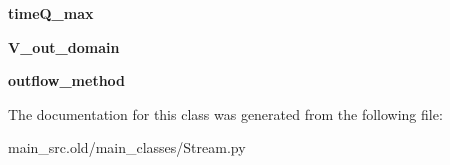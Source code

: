 \begin{DoxyCompactItemize}
\item 
\hypertarget{classmain__src_8old_1_1main__classes_1_1Stream_1_1Reach_aac9f6f373e120874ab3e09865a657eb0}{{\bfseries time\-Q\-\_\-max}}\label{classmain__src_8old_1_1main__classes_1_1Stream_1_1Reach_aac9f6f373e120874ab3e09865a657eb0}

\item 
\hypertarget{classmain__src_8old_1_1main__classes_1_1Stream_1_1Reach_a973c9e233a333a30ac494e4ebc2753d1}{{\bfseries V\-\_\-out\-\_\-domain}}\label{classmain__src_8old_1_1main__classes_1_1Stream_1_1Reach_a973c9e233a333a30ac494e4ebc2753d1}

\item 
\hypertarget{classmain__src_8old_1_1main__classes_1_1Stream_1_1Reach_a91c913d3ca8c213b9982867bc0dd05d6}{{\bfseries outflow\-\_\-method}}\label{classmain__src_8old_1_1main__classes_1_1Stream_1_1Reach_a91c913d3ca8c213b9982867bc0dd05d6}

\end{DoxyCompactItemize}


The documentation for this class was generated from the following file\-:\begin{DoxyCompactItemize}
\item 
main\-\_\-src.\-old/main\-\_\-classes/Stream.\-py\end{DoxyCompactItemize}
